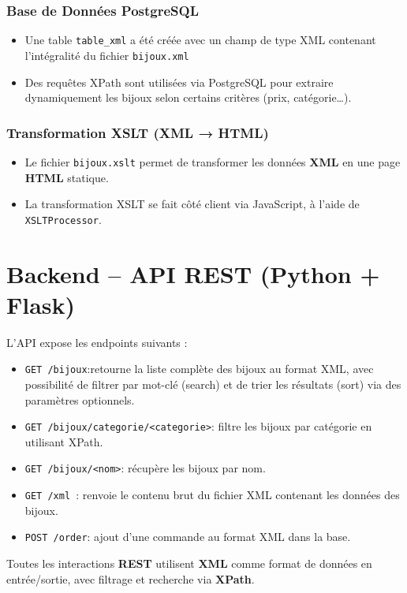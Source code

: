 \documentclass[14pt]{extarticle}
\begin{document}
\subsubsection*{Base de Données PostgreSQL}
\begin{itemize}[label=-]
    \item Une table \texttt{table_xml} a été créée avec un champ de type XML contenant l'intégralité du fichier \texttt{bijoux.xml}
    \item Des requêtes XPath sont utilisées via PostgreSQL pour extraire dynamiquement les bijoux selon certains critères (prix, catégorie…).
\end{itemize}

\subsubsection*{Transformation XSLT (XML → HTML)}
\begin{itemize}[label=-]
    \item Le fichier \texttt{bijoux.xslt} permet de transformer les données \textbf{XML} en une page \textbf{HTML} statique.
    \item La transformation XSLT se fait côté client via JavaScript, à l’aide de \texttt{XSLTProcessor}.
\end{itemize}

\section*{Backend – API REST (Python + Flask)}
L’API expose les endpoints suivants :
\begin{itemize}[label=-]
    \item \texttt{GET /bijoux}:retourne la liste complète des bijoux au format XML, avec possibilité de filtrer par mot-clé (search) et de trier les résultats (sort) via des paramètres optionnels.
    \item \texttt{GET /bijoux/categorie/<categorie>}: filtre les bijoux par catégorie en utilisant XPath.
    \item \texttt{GET /bijoux/<nom>}:  récupère les bijoux par nom.
    \item \texttt{GET /xml }: renvoie le contenu brut du fichier XML contenant les données des bijoux.
    \item \texttt{POST /order}: ajout d’une commande au format XML dans la base.
\end{itemize}
Toutes les interactions \textbf{REST} utilisent \textbf{XML} comme format de données en entrée/sortie, avec filtrage et recherche via \textbf{XPath}.
\end{document}
